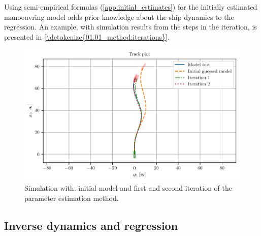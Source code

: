 \noindent Using semi-empirical formulas (\autoref{app:initial_estimates}) for the initially estimated manoeuvring model adds prior knowledge about the ship dynamics to the regression. An example, with simulation results from the steps in the iteration, is presented in \hyperref[\detokenize{01.01_method:iterations}]{\autoref{\detokenize{01.01_method:iterations}}}.


\begin{figure}[H]
    \centering
    \includegraphics[width=\textwidth]{kappa/images/0.pdf}
    \caption{Simulation with: initial model and first and second iteration of the parameter estimation method.}
    \label{\detokenize{01.01_method:iterations}}
\end{figure}

\subsection{Inverse dynamics and regression}
\label{\detokenize{03.01_inverse_dynamics:inverse-dynamics-and-regression}}\label{\detokenize{03.01_inverse_dynamics::doc}}

